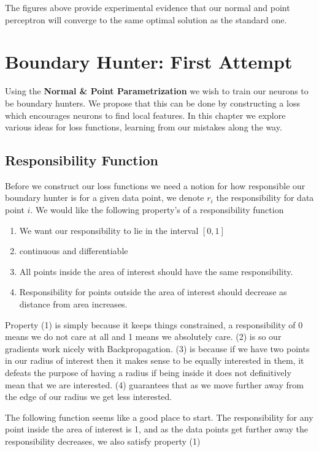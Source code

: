 \documentclass[notitlepage]{report}
\theoremstyle{definition}
\begin{document}
The figures above provide experimental evidence that our normal and point perceptron will converge to the same optimal solution as the standard one.

\chapter{Boundary Hunter: First Attempt}
Using the \textbf{Normal \& Point Parametrization} we wish to train our neurons to be boundary hunters. We propose that this can be done by constructing a loss which encourages neurons to find local features. In this chapter we explore various ideas for loss functions, learning from our mistakes along the way.

\section{Responsibility Function}
Before we construct our loss functions we need a notion for how responsible our boundary hunter is for a given data point, we denote $r_i$ the responsibility for data point $i$. We would like the following property's of a responsibility function

\begin{enumerate}
	\item We want our responsibility to lie in the interval $[0, 1]$
	\item continuous and differentiable
	\item All points inside the area of interest should have the same responsibility.
	\item Responsibility for points outside the area of interest should decrease as distance from area increases.
\end{enumerate}

Property (1) is simply because it keeps things constrained, a responsibility of 0 means we do not care at all and 1 means we absolutely care. (2) is so our gradients work nicely with Backpropagation. (3) is because if we have two points in our radius of interest then it makes sense to be equally interested in them, it defeats the purpose of having a radius if being inside it does not definitively mean that we are interested. (4) guarantees that as we move further away from the edge of our radius we get less interested.

The following function seems like a good place to start. The responsibility for any point inside the area of interest is 1, and as the data points get further away the responsibility decreases, we also satisfy property (1)
\end{document}
